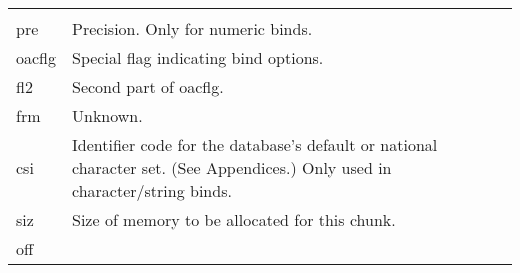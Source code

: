 \begin{longtable}[]{@{}l|l@{}}
\begin{minipage}[t]{0.65\columnwidth}
\end{minipage}\tabularnewline
\begin{minipage}[t]{0.14\columnwidth}\raggedright\strut
pre\strut
\end{minipage} & \begin{minipage}[t]{0.65\columnwidth}\raggedright\strut
Precision. Only for numeric binds.\strut
\end{minipage}\tabularnewline
\begin{minipage}[t]{0.14\columnwidth}\raggedright\strut
oacflg\strut
\end{minipage} & \begin{minipage}[t]{0.65\columnwidth}\raggedright\strut
Special flag indicating bind options.\strut
\end{minipage}\tabularnewline
\begin{minipage}[t]{0.14\columnwidth}\raggedright\strut
fl2\strut
\end{minipage} & \begin{minipage}[t]{0.65\columnwidth}\raggedright\strut
Second part of oacflg.\strut
\end{minipage}\tabularnewline
\begin{minipage}[t]{0.14\columnwidth}\raggedright\strut
frm\strut
\end{minipage} & \begin{minipage}[t]{0.65\columnwidth}\raggedright\strut
Unknown.\strut
\end{minipage}\tabularnewline
\begin{minipage}[t]{0.14\columnwidth}\raggedright\strut
csi\strut
\end{minipage} & \begin{minipage}[t]{0.65\columnwidth}\raggedright\strut
Identifier code for the database's default or national character set.
(See Appendices.) Only used in character/string binds.\strut
\end{minipage}\tabularnewline
\begin{minipage}[t]{0.14\columnwidth}\raggedright\strut
siz\strut
\end{minipage} & \begin{minipage}[t]{0.65\columnwidth}\raggedright\strut
Size of memory to be allocated for this chunk.\strut
\end{minipage}\tabularnewline
\begin{minipage}[t]{0.14\columnwidth}\raggedright\strut
off\strut
\end{minipage} & \begin{minipage}[t]{0.65\columnwidth}\raggedright\strut

\end{minipage}
\end{longtable}
